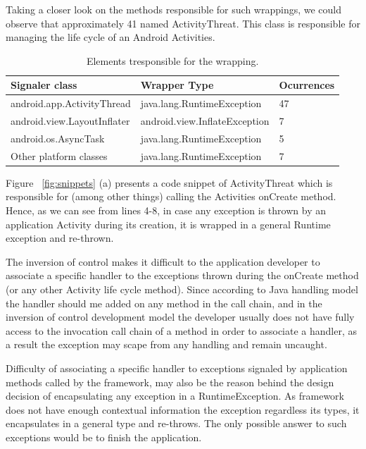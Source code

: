 \documentclass[conference]{IEEEtran}
\begin{document}
Taking a closer look on the methods responsible for such wrappings,
 we could observe that approximately 41%
 named ActivityThreat. This class is responsible for managing the life cycle of an Android Activities. 

\begin{table}
\centering
\begin{tabular}{lll}
    \hline
 \bfseries{Signaler class} &  \bfseries{Wrapper Type} & \bfseries{Ocurrences} \\
    \hline
android.app.ActivityThread & java.lang.RuntimeException & 47 \\
android.view.LayoutInflater & android.view.InflateException &  7 \\
android.os.AsyncTask & java.lang.RuntimeException &  5 \\
Other platform classes & java.lang.RuntimeException &   7 \\
\hline
  \end{tabular}
\caption{Elements tresponsible for the wrapping.}
\label{tab:wrapping01}
\end{table}

Figure ~\ref{fig:snippets} (a) presents a code snippet of ActivityThreat which is responsible for (among other things)
calling the Activities onCreate method. Hence, as we can see from lines 4-8,
 in case any exception is thrown by an application Activity during its creation, 
it is wrapped in a general Runtime exception and re-thrown.



The inversion of control makes it difficult to the application developer to associate 
a specific handler to the exceptions thrown during the onCreate method (or any other Activity life cycle method).
Since according to Java handling model the handler should me added on any method in the call chain,
and in the inversion of control development model the developer usually does not have fully access to 
the invocation call chain of a method in order to associate a handler, as a result the 
exception may scape from any handling and remain uncaught.

Difficulty of associating a specific handler to exceptions signaled by application methods called by the framework,
may also be the reason behind the design decision of encapsulating any exception in a RuntimeException.
As framework does not have enough contextual information the exception regardless its types,
it encapsulates in a general type and re-throws. The only possible answer to such exceptions would be 
to finish the application.
\end{document}
